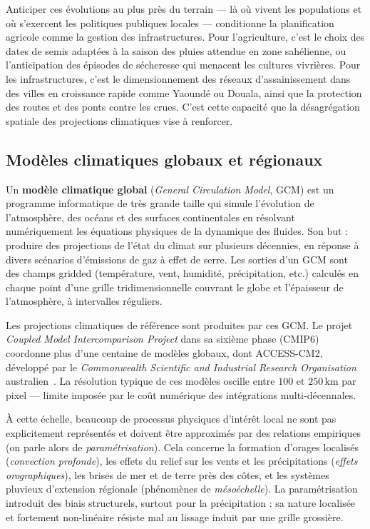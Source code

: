 \documentclass[14pt,a4paper,openany]{extreport}
\theoremstyle{definition}
\begin{document}
Anticiper ces évolutions au plus près du terrain --- là où vivent les populations et où s'exercent les politiques publiques locales --- conditionne la planification agricole comme la gestion des infrastructures. Pour l'agriculture, c'est le choix des dates de semis adaptées à la saison des pluies attendue en zone sahélienne, ou l'anticipation des épisodes de sécheresse qui menacent les cultures vivrières. Pour les infrastructures, c'est le dimensionnement des réseaux d'assainissement dans des villes en croissance rapide comme Yaoundé ou Douala, ainsi que la protection des routes et des ponts contre les crues. C'est cette capacité que la désagrégation spatiale des projections climatiques vise à renforcer.

\subsection{Modèles climatiques globaux et régionaux}
\label{ssec:gcm-rcm}

Un \textbf{modèle climatique global} (\emph{General Circulation Model}, GCM) est un programme informatique de très grande taille qui simule l'évolution de l'atmosphère, des océans et des surfaces continentales en résolvant numériquement les équations physiques de la dynamique des fluides. Son but : produire des projections de l'état du climat sur plusieurs décennies, en réponse à divers scénarios d'émissions de gaz à effet de serre. Les sorties d'un GCM sont des champs gridded (température, vent, humidité, précipitation, etc.) calculés en chaque point d'une grille tridimensionnelle couvrant le globe et l'épaisseur de l'atmosphère, à intervalles réguliers.

Les projections climatiques de référence sont produites par ces GCM. Le projet \emph{Coupled Model Intercomparison Project} dans sa sixième phase (CMIP6) coordonne plus d'une centaine de modèles globaux, dont ACCESS-CM2, développé par le \emph{Commonwealth Scientific and Industrial Research Organisation} australien~\cite{eyring_cmip6_2016}. La résolution typique de ces modèles oscille entre $100$ et $250\,\mathrm{km}$ par pixel --- limite imposée par le coût numérique des intégrations multi-décennales.

À cette échelle, beaucoup de processus physiques d'intérêt local ne sont pas explicitement représentés et doivent être approximés par des relations empiriques (on parle alors de \emph{paramétrisation}). Cela concerne la formation d'orages localisés (\emph{convection profonde}), les effets du relief sur les vents et les précipitations (\emph{effets orographiques}), les brises de mer et de terre près des côtes, et les systèmes pluvieux d'extension régionale (phénomènes de \emph{mésoéchelle}). La paramétrisation introduit des biais structurels, surtout pour la précipitation : sa nature localisée et fortement non-linéaire résiste mal au lissage induit par une grille grossière.
\end{document}
